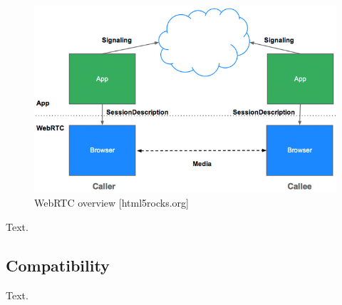 \begin{figure}[htp]
  \begin{center}
    \includegraphics[width=0.9\columnwidth]{resources/webrtc.png}
  \end{center}
  \caption{WebRTC overview [html5rocks.org]}
  \label{fig:webrtc}
\end{figure}

Text.

\subsection{Compatibility}

Text.
